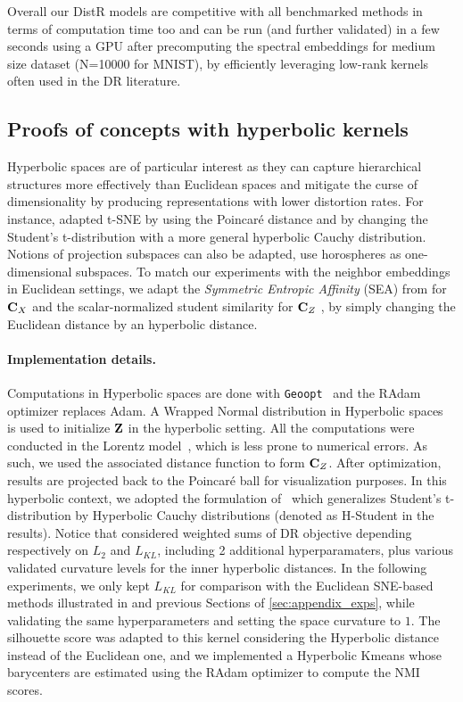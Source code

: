 Overall our DistR models are competitive with all benchmarked methods in terms of computation time too and can be run (and further validated) in a few seconds using a GPU after precomputing the spectral embeddings for medium size dataset (N=10000 for MNIST), by efficiently leveraging low-rank kernels often used in the DR literature.



\subsection{Proofs of concepts with hyperbolic kernels}\label{sec:hyperbolic}

Hyperbolic spaces \citep{Chami21, Fan_2022_CVPR, Guo22, Lin23} are of particular interest as they can capture hierarchical structures more effectively than Euclidean spaces and mitigate the curse of dimensionality by producing representations with lower distortion rates. For instance, \citep{Guo22} adapted t-SNE by using the Poincaré distance and by changing the Student's t-distribution with a more general hyperbolic Cauchy distribution.  Notions of projection subspaces can also be adapted, \eg \citep{Chami21} use horospheres as one-dimensional subspaces. To match our experiments with the neighbor embeddings in Euclidean settings, we adapt the \emph{Symmetric Entropic Affinity} (SEA) from \citep{van2023snekhorn} for ${\mathbf{C}}_X$ and the scalar-normalized student similarity for ${\mathbf{C}}_Z$ \citep{van2008visualizing}, by simply changing the Euclidean distance by an hyperbolic distance.


\paragraph{Implementation details.} Computations in Hyperbolic spaces are done with \texttt{Geoopt}~\citep{geoopt2020kochurov} and the RAdam optimizer \citep{becigneul2018riemannian} replaces Adam. A Wrapped Normal distribution in Hyperbolic spaces~\citep{Nagano19} is used to initialize ${\mathbf{Z}}$ in the hyperbolic setting.
All the computations were conducted in the Lorentz model~\citep{Nickel18}, which is less prone to numerical errors. As such, we used the associated distance function to form ${\mathbf{C}}_Z$. After optimization, results are projected back to the Poincaré ball for visualization purposes. In this hyperbolic context, we adopted the formulation of~\citep{Guo22} which generalizes Student's t-distribution by Hyperbolic Cauchy distributions (denoted as H-Student in the results). Notice that \citep{Guo22} considered weighted sums of DR objective depending respectively on $L_2$ and $L_{KL}$, including 2 additional hyperparamaters, plus various validated curvature levels for the inner hyperbolic distances. In the following experiments, we only kept $L_{KL}$ for comparison with the Euclidean SNE-based methods illustrated in  and previous Sections of \ref{sec:appendix_exps}, while validating the same hyperparameters and setting the space curvature to $1$. The silhouette score was adapted to this kernel considering the Hyperbolic distance instead of the Euclidean one, and we implemented a Hyperbolic Kmeans whose barycenters are estimated using the RAdam optimizer to compute the NMI scores.

